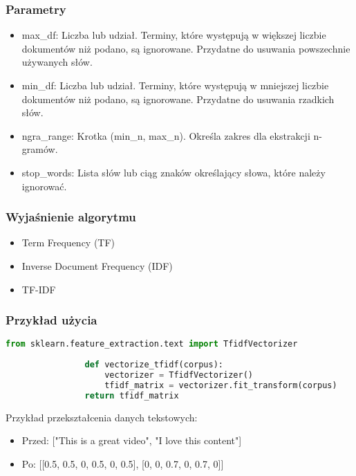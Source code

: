 		
		\subsubsection{Parametry}
			\begin{itemize}
				\item max\_df: Liczba lub udział. Terminy, które występują w większej liczbie dokumentów niż podano, są ignorowane. Przydatne do usuwania powszechnie używanych słów.
				\item min\_df: Liczba lub udział. Terminy, które występują w mniejszej liczbie dokumentów niż podano, są ignorowane. Przydatne do usuwania rzadkich słów.
				\item ngra\_range: Krotka (min\_n, max\_n). Określa zakres dla ekstrakcji n-gramów.
				\item stop\_words: Lista słów lub ciąg znaków określający słowa, które należy ignorować.
			\end{itemize}
		
		\subsubsection{Wyjaśnienie algorytmu}
			\begin{itemize}
				\item Term Frequency (TF)
				\item Inverse Document Frequency (IDF)
				\item TF-IDF
			\end{itemize}
			
				
		\subsubsection{Przykład użycia}
			\begin{lstlisting}[language=Python]
				from sklearn.feature_extraction.text import TfidfVectorizer
	
				def vectorize_tfidf(corpus):
					vectorizer = TfidfVectorizer()
					tfidf_matrix = vectorizer.fit_transform(corpus)
				return tfidf_matrix
			\end{lstlisting}

			Przykład przekształcenia danych tekstowych:	
			\begin{itemize}
				\item Przed: ["This is a great video", "I love this content"]
				\item Po: [[0.5, 0.5, 0, 0.5, 0, 0.5], [0, 0, 0.7, 0, 0.7, 0]]
			\end{itemize}
			
